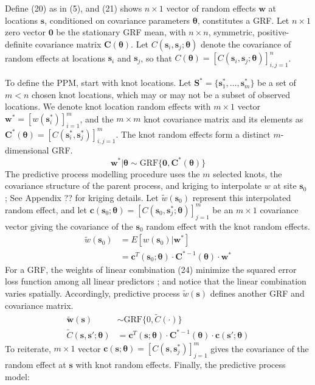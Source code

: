 Define (20) as in (5), and (21) shows $n \times 1$ vector of random effects $\pmb{w}$ at locations $\pmb{s}$, conditioned on covariance parameters $\pmb{\theta}$, constitutes a GRF. Let $n \times 1$ zero vector $\pmb{0}$ be the stationary GRF mean, with $n \times n$, symmetric, positive-definite covariance matrix $\pmb{C}(\pmb{\theta})$. Let $C(\pmb{s}_{i}, \pmb{s}_{j}; \pmb{\theta})$ denote the covariance of random effects at locations $\pmb{s}_{i}$ and $\pmb{s}_{j}$, so that $C(\pmb{\theta}) = [C(\pmb{s}_{i}, \pmb{s}_{j}; \pmb{\theta})]_{i,j=1}^{n}$.

To define the PPM, start with knot locations. Let $\pmb{S}^{*} = \{\pmb{s}_{1}^{*}, \dots, \pmb{s}_{m}^{*}\}$ be a set of $m < n$ chosen knot locations, which may or may not be a subset of observed locations. We denote knot location random effects with $m \times 1$ vector $\pmb{w}^{*} = \left[w(\pmb{s}_{i}^{*})\right]_{i=1}^{m}$, and the $m \times m$ knot covariance matrix and its elements as $\pmb{C}^{*}(\pmb{\theta}) = \left[C(\pmb{s}_{i}^{*}, \pmb{s}_{j}^{*})\right]_{i,j = 1}^{m}$. The knot random effects form a distinct $m$-dimensional GRF.
\begin{equation}
\pmb{w}^{*}|\pmb{\theta} \sim \text{GRF}\{\pmb{0}, \pmb{C}^{*}(\pmb{\theta})\}
\end{equation}
The predictive process modelling procedure uses the $m$ selected knots, the covariance structure of the parent process, and kriging to interpolate $w$ at site $\pmb{s}_{0}$ \citep{Schabenberger2004}; See Appendix ?? for kriging details. Let $\tilde{w}(\pmb{s}_{0})$ represent this interpolated random effect, and let $\pmb{c}(\pmb{s}_{0};\pmb{\theta}) = \left[C(\pmb{s}_{0}, \pmb{s}_{j}^{*}; \pmb{\theta})\right]_{j = 1}^{m}$ be an $m \times 1$  covariance vector giving the covariance of the $\pmb{s}_{0}$ random effect with the knot random effects.
\begin{align}
\tilde{w}(\pmb{s}_{0}) &= E[w(\pmb{s}_{0})|\pmb{w}^{*}] \\ 
&= \pmb{c}^{T}(\pmb{s}_{0};\pmb{\theta}) \cdot \pmb{C}^{*-1}(\pmb{\theta}) \cdot \pmb{w}^{*}
\end{align}
For a GRF, the weights of linear combination (24) minimize the squared error loss function among all linear predictors \citep{Schabenberger2004}; and notice that the linear combination varies spatially. Accordingly, predictive process $\tilde{w}(\pmb{s})$ defines another GRF and covariance matrix.
\begin{align}
\tilde{\pmb{w}}(\pmb{s}) &\sim \text{GRF}\{0, \tilde{C}(\cdot)\} \\
\tilde{C}(\pmb{s}, \pmb{s}'; \pmb{\theta}) &= \pmb{c}^{T}(\pmb{s};\pmb{\theta}) \cdot \pmb{C}^{*-1}(\pmb{\theta}) \cdot \pmb{c}(\pmb{s}';\pmb{\theta})
\end{align}
To reiterate, $m \times 1$ vector $\pmb{c}(\pmb{s};\pmb{\theta}) = \left[C(\pmb{s}, \pmb{s}_{j}^{*})\right]_{j = 1}^{m}$ gives the covariance of the random effect at $\pmb{s}$ with knot random effects. Finally, the predictive process model:

